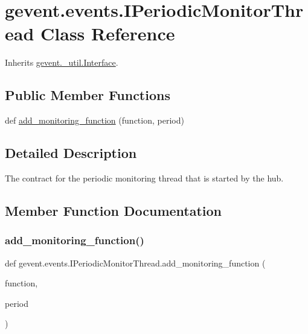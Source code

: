 \hypertarget{classgevent_1_1events_1_1_i_periodic_monitor_thread}{}\section{gevent.\+events.\+I\+Periodic\+Monitor\+Thread Class Reference}
\label{classgevent_1_1events_1_1_i_periodic_monitor_thread}


Inherits \hyperlink{classgevent_1_1__util_1_1_interface}{gevent.\+\_\+util.\+Interface}.

\subsection*{Public Member Functions}
\begin{DoxyCompactItemize}
\item 
def \hyperlink{classgevent_1_1events_1_1_i_periodic_monitor_thread_a756fbdd414b61f69e6689219bd2fccc6}{add\+\_\+monitoring\+\_\+function} (function, period)
\end{DoxyCompactItemize}


\subsection{Detailed Description}
\begin{DoxyVerb}The contract for the periodic monitoring thread that is started
by the hub.
\end{DoxyVerb}
 

\subsection{Member Function Documentation}
\mbox{\label{classgevent_1_1events_1_1_i_periodic_monitor_thread_a756fbdd414b61f69e6689219bd2fccc6}} 
\subsubsection{\texorpdfstring{add\+\_\+monitoring\+\_\+function()}{add\_monitoring\_function()}}
{\footnotesize\ttfamily def gevent.\+events.\+I\+Periodic\+Monitor\+Thread.\+add\+\_\+monitoring\+\_\+function (\begin{DoxyParamCaption}\item[{}]{function,  }\item[{}]{period }\end{DoxyParamCaption})}

